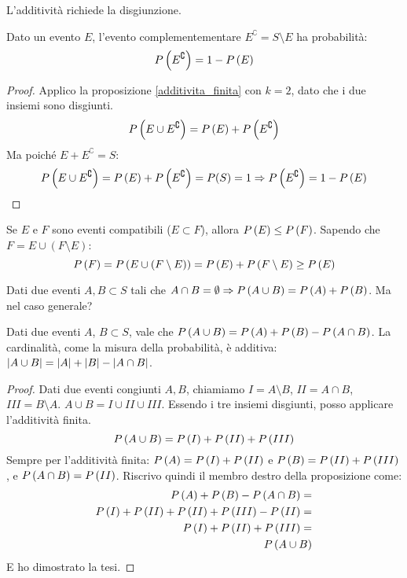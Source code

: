 L'additivit\`a richiede la disgiunzione.

\begin{prop}
Dato un evento $E$, l'evento complementementare $E^{\complement} = S \setminus E$ ha probabilit\`a:
\[
P \left( {E^{\complement}} \right) = 1 - P \left( {E} \right)
\]
\end{prop}
\begin{proof}
Applico la proposizione \ref{additivita_finita} con $k = 2$, dato che i due insiemi sono disgiunti.
\[
P \left( {E \cup E^{\complement}} \right) = P \left( {E} \right) + P \left( {E^{\complement}} \right)
\]
Ma poich\'e $E + E^{\complement} = S$:
\[
P \left( {E \cup E^{\complement}} \right) = P \left( {E} \right) + P \left( {E^{\complement}} \right) = P(S) = 1 \Rightarrow
P \left( {E^{\complement}} \right) = 1 - P \left( {E} \right)
\]
\end{proof}

\begin{prop}
Se $E$ e $F$ sono eventi compatibili ($E \subset F$), allora $P \left( {E} \right) \le P \left( {F} \right)$. Sapendo che $F = E \cup (F \setminus E)$:
\[
P \left( {F} \right) = P \left( {E \cup (F \setminus E)} \right) = P \left( {E} \right) + P \left( {F \setminus E} \right) \ge P \left( {E} \right)
\]
\end{prop}

Dati due eventi $A, B \subset S$ tali che $A \cap B = \emptyset \Rightarrow P \left( {A \cup B} \right) = P \left( {A} \right) + P \left( {B} \right)$. Ma nel caso generale?

\begin{prop}
Dati due eventi $A$, $B \subset S$, vale che $P \left( {A \cup B} \right) = P \left( {A} \right) + P \left( {B} \right) - P \left( {A \cap B} \right)$. La cardinalit\`a, come la misura della probabilit\`a, \`e additiva: $\left\lvert{A \cup B}\right\rvert = \left\lvert{A}\right\rvert + \left\lvert{B}\right\rvert - \left\lvert{A \cap B}\right\rvert$.
\end{prop}
\begin{proof}
Dati due eventi congiunti $A, B$, chiamiamo $I = A \setminus B$, $II = A \cap B$, $III = B \setminus A$. $A \cup B = I \cup II \cup III$. Essendo i tre insiemi disgiunti, posso applicare l'additivit\`a finita.
\[
P \left( {A \cup B} \right) = P \left( {I} \right) + P \left( {II} \right) + P \left( {III} \right)
\]
Sempre per l'additivit\`a finita: $P \left( {A} \right) = P \left( {I} \right) + P \left( {II} \right)$ e $P \left( {B} \right) = P \left( {II} \right) + P \left( {III} \right)$, e $P \left( {A \cap B} \right) = P \left( {II} \right)$. Riscrivo quindi il membro destro della proposizione come:
\begin{align*}
P \left( {A} \right) + P \left( {B} \right) - P \left( {A \cap B} \right) = \\
P \left( {I} \right) + P \left( {II} \right) + P \left( {II} \right) + P \left( {III} \right) - P \left( {II} \right) = \\
P \left( {I} \right) + P \left( {II} \right) + P \left( {III} \right) = \\
P \left( {A \cup B} \right)
\end{align*}
E ho dimostrato la tesi.
\end{proof}

